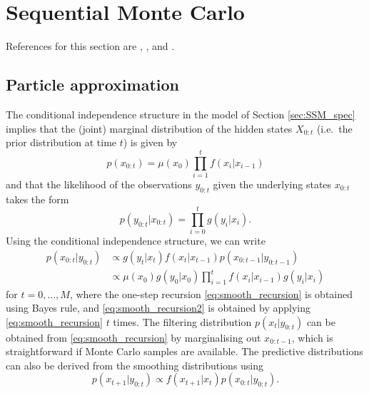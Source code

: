 \documentclass[fleqn]{article}
\theoremstyle{definition}
\begin{document}
\section{Sequential Monte Carlo}\label{sec:SMC}
References for this section are \citet{doucet2001}, \citet{delmoral2006}, and \citet{doucet2009}.
\subsection{Particle approximation}
The conditional independence structure in the model of Section \ref{sec:SSM_spec} implies that the (joint) marginal distribution of the hidden states $X_{0:t}$ (i.e.\ the prior distribution at time $t$) is given by
\begin{equation*} \label{eq:hmm_marginal}
p(x_{0:t}) = \mu(x_0) \prod_{i=1}^t f(x_i | x_{i-1})
\end{equation*}
and that the likelihood of the observations $y_{0:t}$ given the underlying states $x_{0:t}$ takes the form
\begin{equation*} \label{eq:hmm_likelihood}
p(y_{0:t} | x_{0:t}) = \prod_{i=0}^t g(y_i | x_i).
\end{equation*}
Using the conditional independence structure, we can write
\begin{align}
p(x_{0:t} | y_{0:t}) &\propto g(y_t | x_t) f(x_t | x_{t-1}) p(x_{0:t-1} | y_{0:t-1}) \label{eq:smooth_recursion}\\
&\propto \mu(x_0) g(y_0 | x_0) \prod_{i=1}^t f(x_i | x_{i-1}) g(y_i | x_i) \label{eq:smooth_recursion2}
\end{align}
for $t = 0,\dots,M$, where the one-step recursion \eqref{eq:smooth_recursion} is obtained using Bayes rule, and \eqref{eq:smooth_recursion2} is obtained by applying \eqref{eq:smooth_recursion} $t$ times. 
The filtering distribution $p(x_t | y_{0:t})$ can be obtained from \eqref{eq:smooth_recursion} by marginalising out $x_{0:t-1}$, which is straightforward if Monte Carlo samples are available.
The predictive distributions can also be derived from the smoothing distributions using
\begin{equation*}
p(x_{t+1} | y_{0:t}) \propto f(x_{t+1} | x_t) p(x_{0:t} | y_{0:t}).
\end{equation*}
\end{document}
